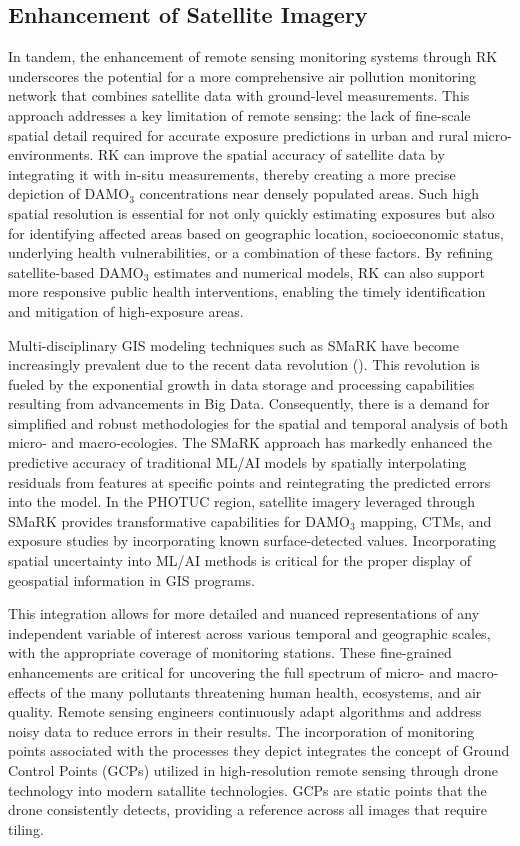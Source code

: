 \subsection{Enhancement of Satellite Imagery} \label{clcsn:enhanceIm} In tandem, the enhancement of remote sensing monitoring systems through RK underscores the potential for a more comprehensive air pollution monitoring network that combines satellite data with ground-level measurements. This approach addresses a key limitation of remote sensing: the lack of fine-scale spatial detail required for accurate exposure predictions in urban and rural micro-environments. RK can improve the spatial accuracy of satellite data by integrating it with in-situ measurements, thereby creating a more precise depiction of DAMO$_3$ concentrations near densely populated areas. Such high spatial resolution is essential for not only quickly estimating exposures but also for identifying affected areas based on geographic location, socioeconomic status, underlying health vulnerabilities, or a combination of these factors. By refining satellite-based DAMO$_3$ estimates and numerical models, RK can also support more responsive public health interventions, enabling the timely identification and mitigation of high-exposure areas.

Multi-disciplinary GIS modeling techniques such as SMaRK have become increasingly prevalent due to the recent data revolution (\cite{goodchild_mapping_2018}). This revolution is fueled by the exponential growth in data storage and processing capabilities resulting from advancements in Big Data. Consequently, there is a demand for simplified and robust methodologies for the spatial and temporal analysis of both micro- and macro-ecologies. The SMaRK approach has markedly enhanced the predictive accuracy of traditional ML/AI models by spatially interpolating residuals from features at specific points and reintegrating the predicted errors into the model. In the PHOTUC region, satellite imagery leveraged through SMaRK provides transformative capabilities for DAMO$_3$ mapping, CTMs, and exposure studies by incorporating known surface-detected values. Incorporating spatial uncertainty into ML/AI methods is critical for the proper display of geospatial information in GIS programs. 

This integration allows for more detailed and nuanced representations of any independent variable of interest across various temporal and geographic scales, with the appropriate coverage of monitoring stations. These fine-grained enhancements are critical for uncovering the full spectrum of micro- and macro-effects of the many pollutants threatening human health, ecosystems, and air quality. Remote sensing engineers continuously adapt algorithms and address noisy data to reduce errors in their results. The incorporation of monitoring points associated with the processes they depict integrates the concept of Ground Control Points (GCPs) utilized in high-resolution remote sensing through drone technology into modern satallite technologies. GCPs are static points that the drone consistently detects, providing a reference across all images that require tiling. 

